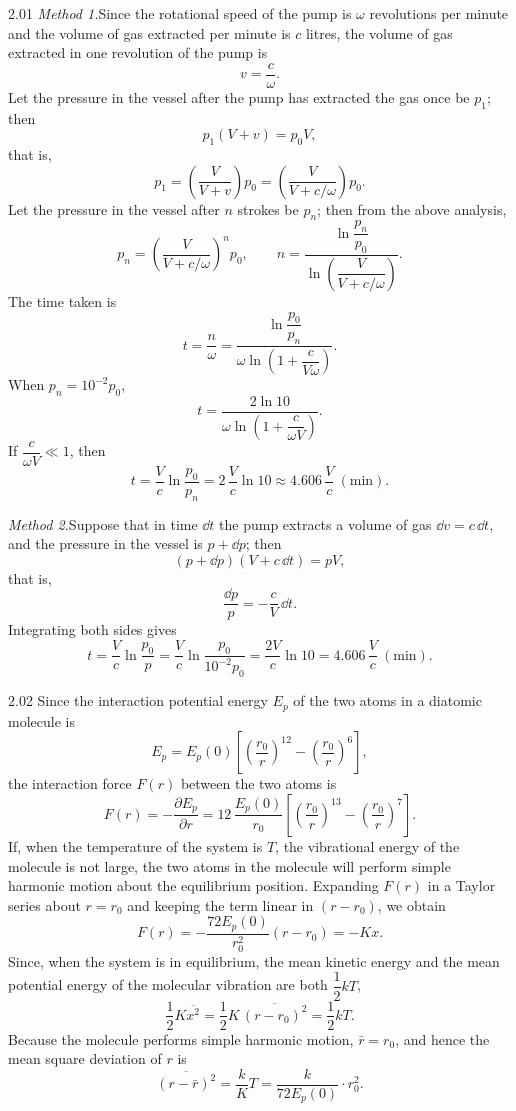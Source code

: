 \begin{solution}{2.01}
\textit{Method 1.}\quad Since the rotational speed of the pump is $\omega$ revolutions per minute and the volume of gas extracted per minute is $c$ litres, the volume of gas extracted in one revolution of the pump is
\[
v=\frac{c}{\omega}.
\]
Let the pressure in the vessel after the pump has extracted the gas once be $p_1$; then
\[
p_1(V+v)=p_0V,
\]
that is,
\[
p_1=\left(\frac{V}{V+v}\right)p_0=\left(\frac{V}{V+c/\omega}\right)p_0.
\]
Let the pressure in the vessel after $n$ strokes be $p_n$; then from the above analysis,
\[
p_n=\left(\frac{V}{V+c/\omega}\right)^{\!n}p_0,
\qquad
n=\frac{\ln\dfrac{p_n}{p_0}}{\ln\left(\dfrac{V}{V+c/\omega}\right)}.
\]
The time taken is
\[
t=\frac{n}{\omega}=\frac{\ln\dfrac{p_0}{p_n}}{\omega\ln\left(1+\dfrac{c}{V\omega}\right)}.
\]
When $p_n=10^{-2}p_0$,
\[
t=\frac{2\ln 10}{\omega\ln\left(1+\dfrac{c}{\omega V}\right)}.
\]
If $\dfrac{c}{\omega V}\ll 1$, then
\[
t=\frac{V}{c}\ln\frac{p_0}{p_n}=2\,\frac{V}{c}\ln 10\approx 4.606\,\frac{V}{c}\ (\text{min}).
\]

\textit{Method 2.}\quad Suppose that in time $\dd t$ the pump extracts a volume of gas $\dd v=c\,\dd t$, and the pressure in the vessel is $p+\dd p$; then
\[
(p+\dd p)(V+c\,\dd t)=pV,
\]
that is,
\[
\frac{\dd p}{p}=-\frac{c}{V}\,\dd t.
\]
Integrating both sides gives
\[
t=\frac{V}{c}\ln\frac{p_0}{p}=\frac{V}{c}\ln\frac{p_0}{10^{-2}p_0}=\frac{2V}{c}\ln 10=4.606\,\frac{V}{c}\ (\text{min}).
\]
\end{solution}

\begin{solution}{2.02}
Since the interaction potential energy $E_p$ of the two atoms in a diatomic molecule is
\[
E_p=E_p(0)\left[\left(\frac{r_0}{r}\right)^{12}-\left(\frac{r_0}{r}\right)^{6}\right],
\]
the interaction force $F(r)$ between the two atoms is
\[
F(r)=-\frac{\partial E_p}{\partial r}=12\,\frac{E_p(0)}{r_0}\left[\left(\frac{r_0}{r}\right)^{13}-\left(\frac{r_0}{r}\right)^{7}\right].
\]
If, when the temperature of the system is $T$, the vibrational energy of the molecule is not large, the two atoms in the molecule will perform simple harmonic motion about the equilibrium position. Expanding $F(r)$ in a Taylor series about $r=r_0$ and keeping the term linear in $(r-r_0)$, we obtain
\[
F(r)=-\frac{72E_p(0)}{r_0^2}(r-r_0)=-Kx.
\]
Since, when the system is in equilibrium, the mean kinetic energy and the mean potential energy of the molecular vibration are both $\dfrac{1}{2}kT$,
\[
\frac{1}{2}K\overline{x^2}=\frac{1}{2}K\,\overline{(r-r_0)^2}=\frac{1}{2}kT.
\]
Because the molecule performs simple harmonic motion, $\bar{r}=r_0$, and hence the mean square deviation of $r$ is
\[
\overline{(r-\bar{r})^2}=\frac{k}{K}T=\frac{k}{72E_p(0)}\cdot r_0^2.
\]
\end{solution}

